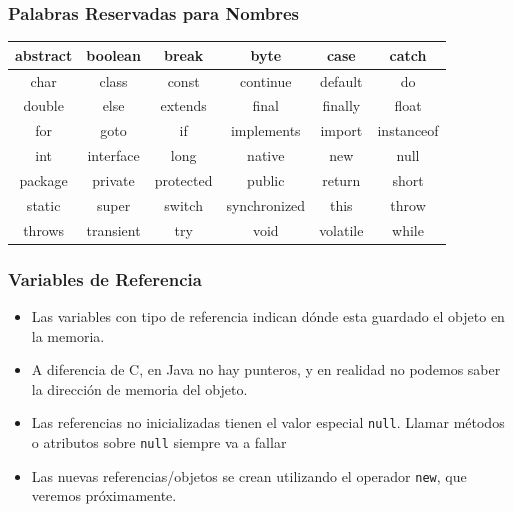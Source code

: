 \documentclass{beamer}
\begin{document}
\begin{frame}
  \frametitle{Palabras Reservadas para Nombres}
  \begin{center}
    \begin{tabular}{|c|c|c|c|c|c|} \hline
      abstract    & boolean    & break     & byte         & case     & catch \\ \hline
      char        & class      & const     & continue     & default  & do    \\ \hline
      double      & else       & extends   & final        & finally  & float \\ \hline
      for         & goto       & if        & implements   & import   & instanceof \\ \hline
      int         & interface  & long      & native       & new      & null \\ \hline
      package     & private    & protected & public       & return   & short \\ \hline
      static      & super      & switch    & synchronized & this     & throw \\ \hline
      throws      & transient  & try       & void         & volatile & while \\ \hline
    \end{tabular}
  \end{center}
\end{frame}

\begin{frame}
  \frametitle{Variables de Referencia} 
  \begin{itemize}
  \item Las variables con tipo de referencia indican dónde esta
    guardado el objeto en la memoria. 
    
  \item A diferencia de C, en Java no hay punteros, y en realidad
    no podemos saber la dirección de memoria del objeto.
    
  \item Las referencias no inicializadas tienen el valor especial
    \texttt{null}. Llamar métodos o atributos sobre \texttt{null}
    siempre va a fallar
    
  \item Las nuevas referencias/objetos se crean utilizando el
    operador \texttt{new}, que veremos próximamente.    
  \end{itemize}
\end{frame}

      
\end{document}
